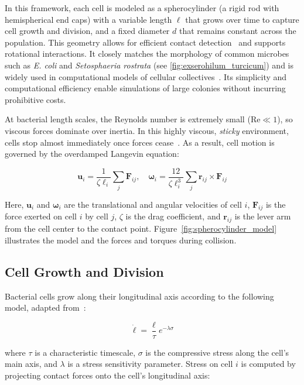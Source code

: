 \documentclass[conference]{IEEEtran}
\begin{document}
In this framework, each cell is modeled as a spherocylinder (a rigid rod with hemispherical end caps) with a variable length $\ell$ that grows over time to capture cell growth and division, and a fixed diameter $d$ that remains constant across the population. This geometry allows for efficient contact detection~\cite{GeometricTools} and supports rotational interactions. It closely matches the morphology of common microbes such as \textit{E. coli} and \textit{Setosphaeria rostrata} (see \autoref{fig:exserohilum_turcicum}) and is widely used in computational models of cellular collectives~\cite{You2018, Weady2024, Blanchard2015, Warren2019, Ghosh2015}. Its simplicity and computational efficiency enable simulations of large colonies without incurring prohibitive costs.

At bacterial length scales, the Reynolds number is extremely small ($\text{Re} \ll 1$), so viscous forces dominate over inertia. In this highly viscous, \textit{sticky} environment, cells stop almost immediately once forces cease~\cite{datta2024lifelowreynoldsnumber,Rudge2012}. As a result, cell motion is governed by the overdamped Langevin equation:

\begin{equation} \label{eq:overdamped_langevin}
    \mathbf{u}_i = \frac{1}{\zeta \ell_i} \sum_j \mathbf{F}_{ij}, \quad
    \boldsymbol{\omega}_i = \frac{12}{\zeta \ell_i^3} \sum_j \mathbf{r}_{ij} \times \mathbf{F}_{ij}
\end{equation}

Here, $\mathbf{u}_i$ and $\boldsymbol{\omega}_i$ are the translational and angular velocities of cell $i$, $\mathbf{F}_{ij}$ is the force exerted on cell $i$ by cell $j$, $\zeta$ is the drag coefficient, and $\mathbf{r}_{ij}$ is the lever arm from the cell center to the contact point. Figure~\ref{fig:spherocylinder_model} illustrates the model and the forces and torques during collision.
\subsection{Cell Growth and Division}

Bacterial cells grow along their longitudinal axis according to the following model, adapted from~\cite{Weady2024SM}:

\begin{equation} \label{eq:growth}
    \dot{\ell} = \frac{\ell}{\tau} e^{-\lambda \sigma}
\end{equation}

where $\tau$ is a characteristic timescale, $\sigma$ is the compressive stress along the cell's main axis, and $\lambda$ is a stress sensitivity parameter. Stress on cell $i$ is computed by projecting contact forces onto the cell's longitudinal axis:
\end{document}
